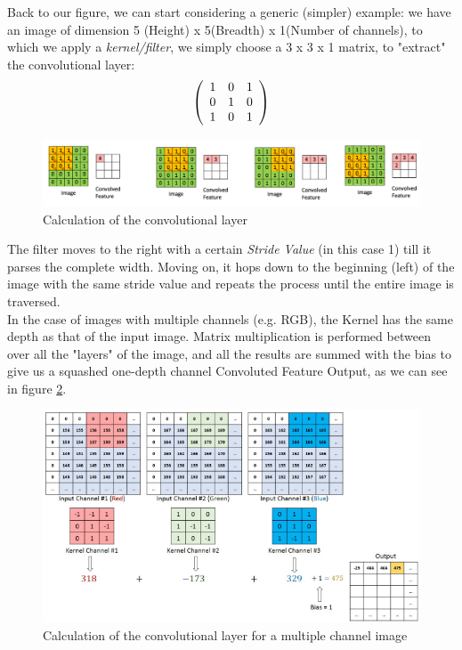 \documentclass[12pt]{report}
\theoremstyle{plain}
\begin{document}
\begin{flushleft}
Back to our figure, we can start considering a generic (simpler) example: we have an image of dimension 5 (Height) x 5(Breadth) x 1(Number of channels), to which we apply a \textit{kernel/filter}, we simply choose a 3 x 3 x 1 matrix, to "extract" the convolutional layer:
\[ \left(\begin{array}{c c c}
1  &0  &1\\ 0  &1  &0\\ 1  &0  &1\\
\end{array}\right) \]
\begin{figure}[!h]
	\centering
	\includegraphics[scale=0.9]{images/convNN_image_convlay.pdf}
	\caption{Calculation of the convolutional layer}
	\label{fig:convNN_image_base_appl}	
\end{figure}

The filter moves to the right with a certain \textit{Stride Value} (in this case 1) till it parses the complete width. Moving on, it hops down to the beginning (left) of the image with the same stride value and repeats the process until the entire image is traversed.\\
In the case of images with multiple channels (e.g. RGB), the Kernel has the same depth as that of the input image. Matrix multiplication is performed between over all the "layers" of the image, and all the results are summed with the bias to give us a squashed one-depth channel Convoluted Feature Output, as we can see in figure \ref{fig:convNN_image_multchann}.

\begin{figure}[!h]
	\centering
	\includegraphics[scale=1.1]{images/convNN_image_multconvlay.pdf}
	\caption{Calculation of the convolutional layer for a multiple channel image}
	\label{fig:convNN_image_multchann}
\end{figure}


\end{flushleft}
\end{document}
